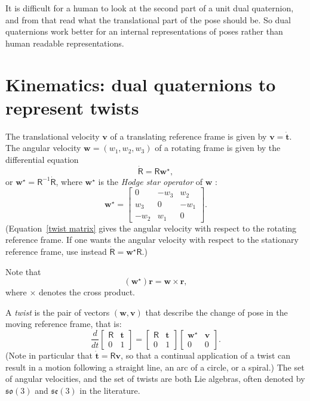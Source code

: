 \documentclass[reqno,12pt]{amsart}
\newcommand\starop[1]{#1^\star}
\begin{document}
It is difficult for a human to look at the second part of a unit dual quaternion, and from that read what the translational part of the pose should be.  So dual quaternions work better for an internal representations of poses rather than human readable representations.

\section{Kinematics: dual quaternions to represent twists}
\label{sec twists}

The translational velocity $\bm v$ of a translating reference frame is given by $\bm v = \dot{\bm t}$.  The angular velocity $\bm w = (w_1, w_2, w_3)$ of a rotating frame is given by the differential equation
\begin{equation}
\label{twist matrix}
\dot{\mathsf R} = \mathsf R \starop{\bm w},
\end{equation}
or $\starop{\bm w} = \mathsf R^{-1} \dot{\mathsf R}$,
where $\starop{\bm w}$ is the \emph{Hodge star operator} of $\bm w$ \cite{wiki0}:
\begin{equation}
\starop{\bm w} = \begin{bmatrix}  0   & -w_3 &  w_2 \\
                               w_3 &  0   & -w_1 \\
                              -w_2 &  w_1 &  0 \end{bmatrix} .
\end{equation}
(Equation~\eqref{twist matrix} gives the angular velocity with respect to the rotating reference frame.  If one wants the angular velocity with respect to the stationary reference frame, use instead $\dot{\mathsf R} = \starop{\bm w} \mathsf R$.)

Note that
\begin{equation}
\label{w star to w cross}
(\starop{\bm w}) \bm r = \bm w \times \bm r ,
\end{equation}
where $\times$ denotes the cross product.

A \emph{twist} is the pair of vectors $(\bm w, \bm v)$ that describe the change of pose in the moving reference frame, that is:
\begin{equation}
\label{ode twist}
\frac d{dt} \begin{bmatrix} \mathsf R & \bm t \\ 0 & 1 \end{bmatrix}
= \begin{bmatrix} \mathsf R & \bm t \\ 0 & 1 \end{bmatrix}
\begin{bmatrix} \starop{\bm w} & \bm v \\ 0 & 0 \end{bmatrix}.
\end{equation}
(Note in particular that $\dot{\bm t} = \mathsf R \bm v$, so that a continual application of a twist can result in a motion following a straight line, an arc of a circle, or a spiral.)  The set of angular velocities, and the set of twists are both Lie algebras, often denoted by $\mathfrak{so}(3)$ and $\mathfrak{se}(3)$ in the literature.
\end{document}
